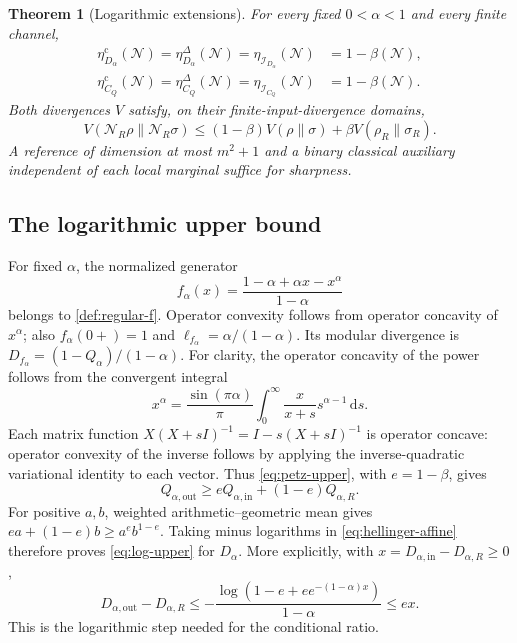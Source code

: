 \documentclass[11pt]{article}
\numberwithin{equation}{section}
\newtheorem{theorem}{Theorem}[section]
\theoremstyle{definition}
\theoremstyle{remark}
\newcommand{\N}{\mathcal N}
\newcommand{\dd}{\,\mathrm d}
\begin{document}
\begin{theorem}[Logarithmic extensions]
\label{thm:renyi-chernoff}
For every fixed $0<\alpha<1$ and every finite channel,
\begin{align}
 \eta_{D_\alpha}^{\mathrm c}(\N)
 =\eta_{D_\alpha}^{\Delta}(\N)
 =\eta_{\mathcal I_{D_\alpha}}(\N)&=1-\beta(\N), \label{eq:renyi-exact}\\
 \eta_{C_Q}^{\mathrm c}(\N)
 =\eta_{C_Q}^{\Delta}(\N)
 =\eta_{\mathcal I_{C_Q}}(\N)&=1-\beta(\N). \label{eq:chernoff-exact}
\end{align}
Both divergences $V$ satisfy, on their finite-input-divergence domains,
\begin{equation}
 V(\N_R\rho\|\N_R\sigma)
 \leq(1-\beta)V(\rho\|\sigma)+\beta V(\rho_R\|\sigma_R).
 \label{eq:log-upper}
\end{equation}
A reference of dimension at most $m^2+1$ and a binary classical
auxiliary independent of each local marginal suffice for sharpness.
\end{theorem}

\subsection{The logarithmic upper bound}

For fixed $\alpha$, the normalized generator
\[
 f_\alpha(x)=\frac{1-\alpha+\alpha x-x^\alpha}{1-\alpha}
\]
belongs to \cref{def:regular-f}. Operator convexity follows from
operator concavity of $x^\alpha$; also
$f_\alpha(0+)=1$ and $\ell_{f_\alpha}=\alpha/(1-\alpha)$.
Its modular divergence is
$D_{f_\alpha}=(1-Q_\alpha)/(1-\alpha)$.
For clarity, the operator concavity of the power follows from the
convergent integral
\[
 x^\alpha=\frac{\sin(\pi\alpha)}{\pi}
       \int_0^\infty \frac{x}{x+s}s^{\alpha-1}\dd s .
\]
Each matrix function $X(X+sI)^{-1}=I-s(X+sI)^{-1}$ is operator
concave: operator convexity of the inverse follows by applying the
inverse-quadratic variational identity to each vector.
Thus \eqref{eq:petz-upper}, with $e=1-\beta$, gives
\begin{equation}
 Q_{\alpha,\mathrm{out}}\geq
       eQ_{\alpha,\mathrm{in}}+(1-e)Q_{\alpha,R}.
 \label{eq:hellinger-affine}
\end{equation}
For positive $a,b$, weighted arithmetic--geometric mean gives
$ea+(1-e)b\geq a^e b^{1-e}$.
Taking minus logarithms in \eqref{eq:hellinger-affine} therefore proves
\eqref{eq:log-upper} for $D_\alpha$.
More explicitly, with
$x=D_{\alpha,\mathrm{in}}-D_{\alpha,R}\geq0$,
\[
 D_{\alpha,\mathrm{out}}-D_{\alpha,R}
 \leq-\frac{\log(1-e+e e^{-(1-\alpha)x})}{1-\alpha}
 \leq ex.
\]
This is the logarithmic step needed for the conditional ratio.
\end{document}
